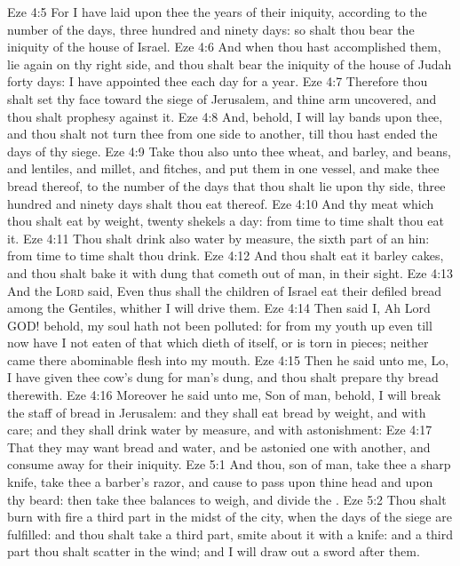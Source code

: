 \vs Eze 4:5 For I have laid upon thee the years of their iniquity, according to the number of the days, three hundred and ninety days: so shalt thou bear the iniquity of the house of Israel.
\vs Eze 4:6 And when thou hast accomplished them, lie again on thy right side, and thou shalt bear the iniquity of the house of Judah forty days: I have appointed thee each day for a year.
\vs Eze 4:7 Therefore thou shalt set thy face toward the siege of Jerusalem, and thine arm  uncovered, and thou shalt prophesy against it.
\vs Eze 4:8 And, behold, I will lay bands upon thee, and thou shalt not turn thee from one side to another, till thou hast ended the days of thy siege.
\vs Eze 4:9 Take thou also unto thee wheat, and barley, and beans, and lentiles, and millet, and fitches, and put them in one vessel, and make thee bread thereof,  to the number of the days that thou shalt lie upon thy side, three hundred and ninety days shalt thou eat thereof.
\vs Eze 4:10 And thy meat which thou shalt eat  by weight, twenty shekels a day: from time to time shalt thou eat it.
\vs Eze 4:11 Thou shalt drink also water by measure, the sixth part of an hin: from time to time shalt thou drink.
\vs Eze 4:12 And thou shalt eat it  barley cakes, and thou shalt bake it with dung that cometh out of man, in their sight.
\vs Eze 4:13 And the \textsc{Lord} said, Even thus shall the children of Israel eat their defiled bread among the Gentiles, whither I will drive them.
\vs Eze 4:14 Then said I, Ah Lord GOD! behold, my soul hath not been polluted: for from my youth up even till now have I not eaten of that which dieth of itself, or is torn in pieces; neither came there abominable flesh into my mouth.
\vs Eze 4:15 Then he said unto me, Lo, I have given thee cow's dung for man's dung, and thou shalt prepare thy bread therewith.
\vs Eze 4:16 Moreover he said unto me, Son of man, behold, I will break the staff of bread in Jerusalem: and they shall eat bread by weight, and with care; and they shall drink water by measure, and with astonishment:
\vs Eze 4:17 That they may want bread and water, and be astonied one with another, and consume away for their iniquity.
\vs Eze 5:1 And thou, son of man, take thee a sharp knife, take thee a barber's razor, and cause  to pass upon thine head and upon thy beard: then take thee balances to weigh, and divide the .
\vs Eze 5:2 Thou shalt burn with fire a third part in the midst of the city, when the days of the siege are fulfilled: and thou shalt take a third part,  smite about it with a knife: and a third part thou shalt scatter in the wind; and I will draw out a sword after them.
